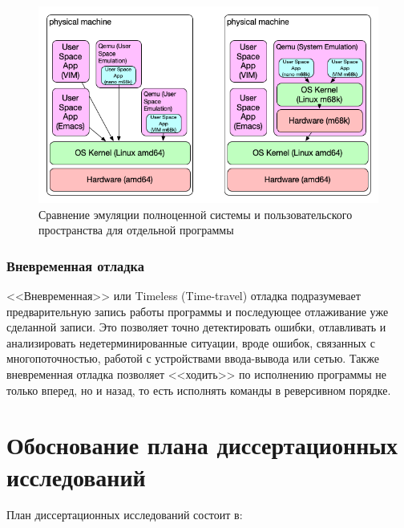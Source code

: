\begin{figure}[!htbp]
    \centering
    \begin{adjustbox}{max totalsize={0.8\textwidth}{\textheight}}
        \includegraphics[]{images/qemu-userspace.png}
    \end{adjustbox}
    \caption{Сравнение эмуляции полноценной системы и пользовательского пространства для отдельной программы}\label{fig:qemu-userspace}
\end{figure}


\subsubsection{Вневременная отладка}\label{sec:ch1/sec2/sub3/sub1}

<<Вневременная>> или Timeless (Time-travel) отладка подразумевает предварительную запись работы программы и
последующее отлаживание уже сделанной записи. Это позволяет точно детектировать ошибки, отлавливать и
анализировать недетерминированные ситуации, вроде ошибок, связанных с многопоточностью, работой с
устройствами ввода-вывода или сетью. Также вневременная отладка позволяет <<ходить>> по исполнению
программы не только вперед, но и назад, то есть исполнять команды в реверсивном порядке.


\section{Обоснование плана диссертационных исследований}\label{sec:ch1/sec3}

План диссертационных исследований состоит в:

